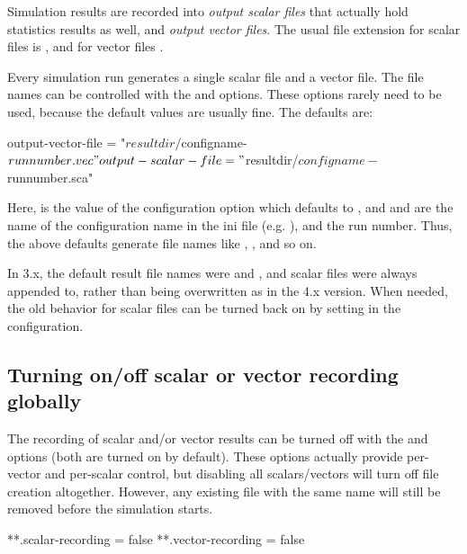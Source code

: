 Simulation results are recorded into \textit{output scalar files} that
actually hold statistics results as well, and \textit{output vector
files}. The usual file extension for scalar files is , and
for vector files .

Every simulation run generates a single scalar file and a vector file.
The file names can be controlled with the 
and  options. These options rarely need
to be used, because the default values are usually fine. The defaults
are:

\begin{inifile}
output-vector-file = "${resultdir}/${configname}-${runnumber}.vec"
output-scalar-file = "${resultdir}/${configname}-${runnumber}.sca"
\end{inifile}

Here,  is the value of the 
configuration option which defaults to , and
 and  are the name of
the configuration name in the ini file (e.g. ),
and the run number. Thus, the above defaults generate file names
like , ,
and so on.

\begin{note}
  In {\opp} 3.x, the default result file names were  and
  , and scalar files were always appended to, rather than
  being overwritten as in the 4.x version. When needed, the old behavior
  for scalar files can be turned back on by setting
   in the configuration.
\end{note}

\subsection{Turning on/off scalar or vector recording globally}

The recording of scalar and/or vector results can be turned off with
the  and  options (both
are turned on by default). These options actually provide per-vector
and per-scalar control, but disabling all scalars/vectors will turn off
file creation altogether. However, any existing file with the same name
will still be removed before the simulation starts.

\begin{inifile}
**.scalar-recording = false
**.vector-recording = false
\end{inifile}


